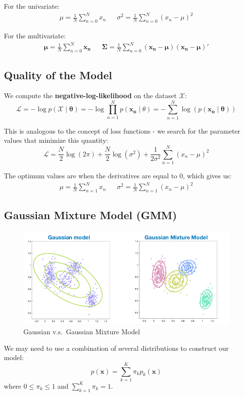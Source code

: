 \documentclass[11pt]{article}
\begin{document}
For the univariate:
\begin{align*}
  \mu = \frac{1}{N} \sum_{n = 0}^N x_n && \sigma^2 = \frac{1}{N} \sum_{n=0}^N (x_n - \mu)^2
\end{align*}

For the multivariate:
\begin{align*}
  \bm{\mu} = \frac{1}{N} \sum_{n = 0}^N \bm{x_n} && \bm{\Sigma} = \frac{1}{N} \sum_{n=0}^N (\bm{x_n} - \bm{\mu})(\bm{x_n} - \bm{\mu})'
\end{align*}

\subsection{Quality of the Model}
We compute the \textbf{negative-log-likelihood} on the dataset $\mathcal{X}$:
\[
  \mathcal{L} = - \log p(\bm{\mathcal{X}} \mid \bm{\theta}) = - \log \prod_{n = 1}^N p(\bm{x_n} \mid \theta) = - \sum_{n = 1}^N \log(p(\bm{x_n} \mid \bm{\theta})) 
\]

This is analogous to the concept of loss functions - we search for the parameter values that minimize this quantity:
\[
  \mathcal{L} = \frac{N}{2} \log(2 \pi) + \frac{N}{2} \log(\sigma^2) + \frac{1}{2\sigma^2} \sum_{n = 1}^N (x_n - \mu)^2 
\]

The optimum values are when the derivatives are equal to $0$, which gives us:
\begin{align*}
  \mu = \frac{1}{N} \sum_{n = 1}^N x_n && \sigma^2 = \frac{1}{N} \sum_{n = 1}^N (x_n - \mu)^2
\end{align*}

\subsection{Gaussian Mixture Model (GMM)}
\begin{figure}[htb!]
  \centering
  \caption{Gaussian v.s.\ Gaussian Mixture Model}
  \includegraphics[scale=0.5]{mixture}
\end{figure}
We may need to use a combination of several distributions to construct our model:
\[
  p(\bm{x}) = \sum_{k = 1}^K \pi_k p_k (\bm{x}) 
\]
where $0 \leq \pi_k \leq 1$ and $\sum_{k = 1}^K \pi_k = 1$.
\end{document}
